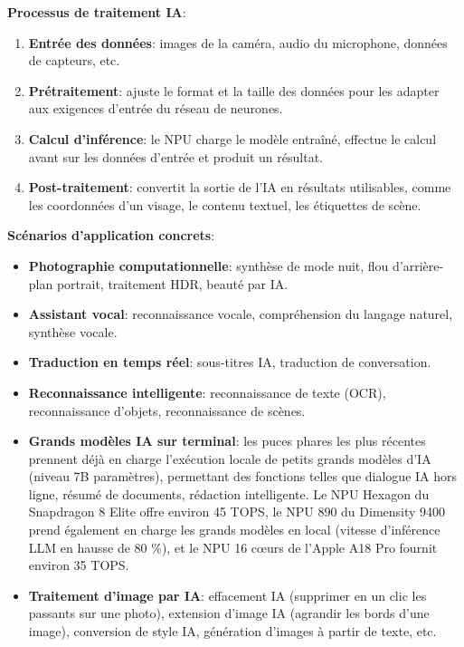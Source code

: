 \textbf{Processus de traitement IA}:

\begin{enumerate}
  \item \textbf{Entrée des données}: images de la caméra, audio du microphone, données de capteurs, etc.
  \item \textbf{Prétraitement}: ajuste le format et la taille des données pour les adapter aux exigences d'entrée du réseau de neurones.
  \item \textbf{Calcul d'inférence}: le NPU charge le modèle entraîné, effectue le calcul avant sur les données d'entrée et produit un résultat.
  \item \textbf{Post-traitement}: convertit la sortie de l'IA en résultats utilisables, comme les coordonnées d'un visage, le contenu textuel, les étiquettes de scène.
\end{enumerate}

\textbf{Scénarios d'application concrets}:

\begin{itemize}
  \item \textbf{Photographie computationnelle}: synthèse de mode nuit, flou d'arrière-plan portrait, traitement HDR, beauté par IA.
  \item \textbf{Assistant vocal}: reconnaissance vocale, compréhension du langage naturel, synthèse vocale.
  \item \textbf{Traduction en temps réel}: sous-titres IA, traduction de conversation.
  \item \textbf{Reconnaissance intelligente}: reconnaissance de texte (OCR), reconnaissance d'objets, reconnaissance de scènes.
  \item \textbf{Grands modèles IA sur terminal}: les puces phares les plus récentes prennent déjà en charge l'exécution locale de petits grands modèles d'IA (niveau 7B paramètres), permettant des fonctions telles que dialogue IA hors ligne, résumé de documents, rédaction intelligente. Le NPU Hexagon du Snapdragon 8 Elite offre environ 45 TOPS, le NPU 890 du Dimensity 9400 prend également en charge les grands modèles en local (vitesse d'inférence LLM en hausse de 80 \%), et le NPU 16 cœurs de l'Apple A18 Pro fournit environ 35 TOPS.
  \item \textbf{Traitement d'image par IA}: effacement IA (supprimer en un clic les passants sur une photo), extension d'image IA (agrandir les bords d'une image), conversion de style IA, génération d'images à partir de texte, etc.
\end{itemize}


